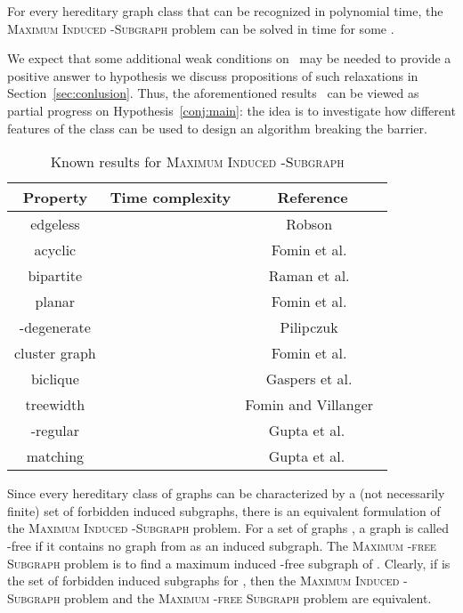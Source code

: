\begin{hypothesis}\label{conj:main}
For every hereditary graph class  that can be recognized in polynomial time, the \textsc{Maximum Induced -Subgraph} problem can be solved in time  for some .
\end{hypothesis}

We expect that some additional weak conditions on~ may be needed to provide a positive answer to hypothesis we discuss propositions of such relaxations in Section~\ref{sec:conlusion}. Thus, the aforementioned results~\cite{FominGKLS10,FominGPR08-On,FominTV11,FominTV13,GaspersKL12,PilipczukP12,RamanSS07,Robson86} can be viewed as partial progress on Hypothesis~\ref{conj:main}: the idea is to investigate how different features of the class  can be used to design an algorithm breaking the  barrier.



\begin{table}[h!]
\begin{center}
\begin{tabular}{|c|c|c|}
\hline
Property & Time complexity &  Reference\\
\hline
edgeless &   & Robson~\cite{Robson86}\\
acyclic &  & Fomin et al.~\cite{FominGPR08-On}\\
bipartite &  & Raman et al.~\cite{RamanSS07}\\
planar &  & Fomin et al.~\cite{FominTV11}\\
-degenerate &  & Pilipczuk~\cite{PilipczukP12}\\
cluster graph &  & Fomin et al.~\cite{FominGKLS10}\\
biclique &   & Gaspers et al.~\cite{GaspersKL12}\\
 treewidth &    & Fomin and Villanger~\cite{Fomin:2010ys}\\
-regular &  & Gupta et al. ~\cite{GuptaRS12}\\
matching &  & Gupta et al. ~\cite{GuptaRS12}\\
\hline
\end{tabular}
\end{center}
\caption{Known results for \textsc{Maximum Induced -Subgraph}}\label{table1}
\end{table}

Since every hereditary class of graphs  can be characterized by a (not necessarily finite) set of forbidden induced subgraphs, there is an equivalent formulation of the \textsc{Maximum Induced   -Subgraph} problem. For a set of graphs , a graph  is called -free if it contains no graph from  as an induced subgraph. The \textsc{Maximum -free Subgraph} problem is to find a maximum induced -free subgraph of . Clearly, if  is the set of forbidden induced subgraphs for , then the \textsc{Maximum Induced -Subgraph} problem and the \textsc{Maximum -free Subgraph} problem are equivalent.

